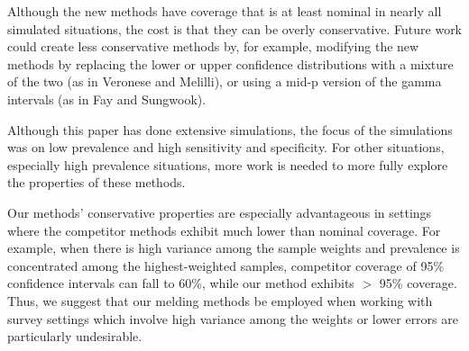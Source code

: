 Although the new methods have coverage that is at least nominal in nearly all simulated situations, the cost is that they can be overly conservative.
Future work could create less conservative methods by, for example, modifying the new methods by replacing the lower or upper confidence distributions with a mixture of the two (as in Veronese and Melilli\cite{veronese2015}), or using a mid-p version of the gamma intervals (as in Fay and Sungwook\cite{FayK:2017}).

Although this paper has done extensive simulations, the focus of the simulations was on low prevalence and high
sensitivity and specificity. For other situations, especially high prevalence situations, more work is needed to more fully explore the properties of these methods.

Our methods' conservative properties are especially advantageous in settings where the competitor methods exhibit much lower than nominal coverage.
For example, when there is high variance among the sample weights and prevalence is concentrated among the highest-weighted samples, competitor coverage of 95\% confidence intervals can fall to 60\%, while our method exhibits \( > \) 95\% coverage.
Thus, we suggest that our melding methods be employed when working with survey settings which involve high variance among the weights or lower errors are particularly undesirable.
